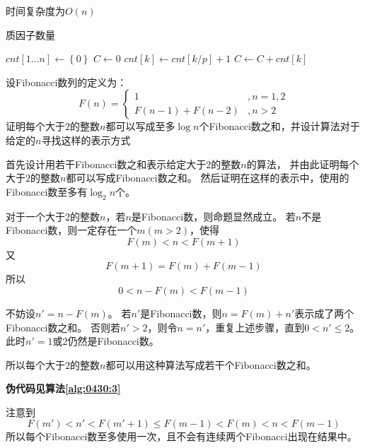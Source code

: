 \begin{questions}
\begin{solution}
        时间复杂度为$O(n)$
    \end{solution}

    \begin{algorithm}[!htp]
        \caption{质因子数量}\label{alg:0430:2}
        \begin{algorithmic}[1]
            \State $cnt[1 \dots n] \gets \left\{0\right\}$
            \State $C \gets 0$
            \State $cnt[k] \gets cnt[k/p] + 1$
            \State $C \gets C + cnt[k]$
            \EndIf
            \EndFor
        \end{algorithmic}
    \end{algorithm}

    \question 设Fibonacci数列的定义为：
    \[
        F(n) = \begin{cases}
            1             & , n=1,2 \\
            F(n-1)+F(n-2) & , n > 2
        \end{cases}
    \]
    证明每个大于$2$的整数$n$都可以写成至多$\log{n}$个Fibonacci数之和，并设计算法对于给定的$n$寻找这样的表示方式
    \begin{solution}
        首先设计用若干Fibonacci数之和表示给定大于$2$的整数$n$的算法，
        并由此证明每个大于$2$的整数$n$都可以写成Fibonacci数之和。
        然后证明在这样的表示中，使用的Fibonacci数至多有$\log_2{n}$个。

        对于一个大于$2$的整数$n$，若$n$是Fibonacci数，则命题显然成立。
        若$n$不是Fibonacci数，则一定存在一个$m(m>2)$，使得\[
            F(m) < n < F(m+1)
        \]
        又\[
            F(m+1) = F(m) + F(m-1)
        \]
        所以\[
            0 < n - F(m) < F(m-1)
        \]

        不妨设$n' = n - F(m)$。
        若$n'$是Fibonacci数，则$n = F(m) + n'$表示成了两个Fibonacci数之和。
        否则若$n' > 2$，则令$n=n'$，重复上述步骤，直到$0 < n' \le 2$。
        此时$n'=1$或$2$仍然是Fibonacci数。

        所以每个大于$2$的整数$n$都可以用这种算法写成若干个Fibonacci数之和。

        \textbf{伪代码见算法\ref{alg:0430:3}}

        注意到\[
            F(m') < n' < F(m' + 1) \le F(m-1) < F(m) < n < F(m-1)
        \]
        所以每个Fibonacci数至多使用一次，且不会有连续两个Fibonacci出现在结果中。


\end{solution}
\end{questions}
